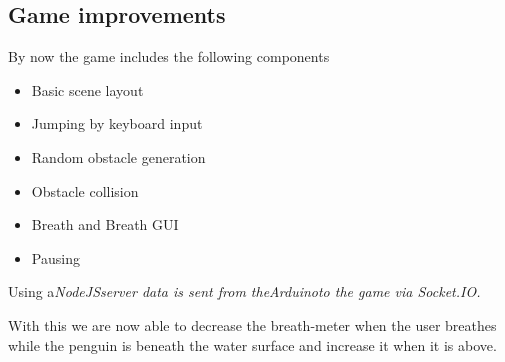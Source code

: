 \documentclass{article}
\begin{document}
    \subsection{Game improvements}
        By now the game includes the following components
        \begin{itemize}
            \item Basic scene layout
            \item Jumping by keyboard input
            \item Random obstacle generation
            \item Obstacle collision
            \item Breath and Breath GUI
            \item Pausing
        \end{itemize}

        Using a\em NodeJS\em server data is sent from the\em Arduino\em to the game via \em Socket.IO\em.

        With this we are now able to decrease the breath-meter when the user breathes while the penguin is beneath the water surface and increase it when it is above.
\end{document}

